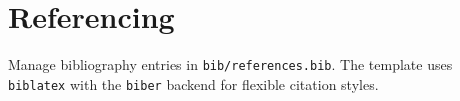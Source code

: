 \section{Referencing}

Manage bibliography entries in \texttt{bib/references.bib}. The template uses \texttt{biblatex} with the \texttt{biber} backend for flexible citation styles.

\nocite{*} %

